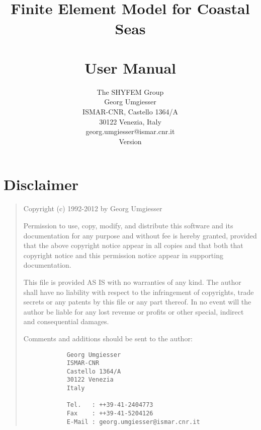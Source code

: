 \documentclass{report}
\title{%
	\shy{} 
	\\Finite Element Model for Coastal Seas
	\\~
	\\User Manual
	}
\author{%
	The SHYFEM Group \\
	Georg Umgiesser
	\\ISMAR-CNR, Castello 1364/A
	\\30122 Venezia, Italy
	\vspace{0.5cm}
	\\georg.umgiesser@ismar.cnr.it
	\vspace{1cm}
	\\Version \VERSION
	}
\begin{document}


\pagestyle{plain}

\maketitle


\thispagestyle{empty}

\newpage

\tableofcontents

\newpage





\chapter*{Disclaimer}


\begin{quotation}
  									 
   Copyright (c) 1992-2012 by Georg Umgiesser				 
  									 
   Permission to use, copy, modify, and distribute this software	 
   and its documentation for any purpose and without fee is hereby	 
   granted, provided that the above copyright notice appear in all	 
   copies and that both that copyright notice and this permission	 
   notice appear in supporting documentation.				 
  									 
   This file is provided AS IS with no warranties of any kind.		 
   The author shall have no liability with respect to the		 
   infringement of copyrights, trade secrets or any patents by		 
   this file or any part thereof.  In no event will the author		 
   be liable for any lost revenue or profits or other special,		 
   indirect and consequential damages.					 
  									 
   Comments and additions should be sent to the author:			 
  									 
	\begin{verbatim}
  			Georg Umgiesser					 
  			ISMAR-CNR					 
  			Castello 1364/A
  			30122 Venezia					 
  			Italy						 
  									 
  			Tel.   : ++39-41-2404773			 
  			Fax    : ++39-41-5204126			 
  			E-Mail : georg.umgiesser@ismar.cnr.it
	\end{verbatim}
\end{quotation}
\end{document}
